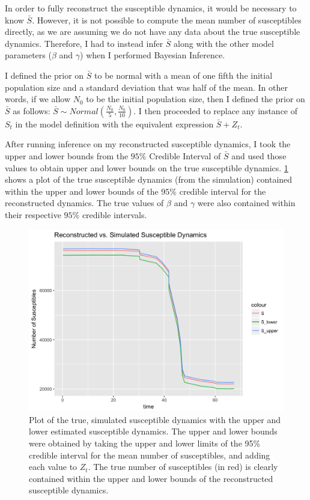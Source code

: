 \documentclass{article}
\begin{document}
In order to fully reconstruct the susceptible dynamics, it would be necessary to know $\bar{S}$. However, it is not possible to compute the mean number of susceptibles directly, as we are assuming we do not have any data about the true susceptible dynamics. Therefore, I had to instead infer $\bar{S}$ along with the other model parameters ($\beta$ and $\gamma$) when I performed Bayesian Inference. 

I defined the prior on $\bar{S}$ to be normal with a mean of one fifth the initial population size and a standard deviation that was half of the mean. In other words, if we allow $N_{0}$ to be the initial population size, then I defined the prior on $\bar{S}$ as follows: $\bar{S} \sim Normal(\frac{N_{0}}{5}, \frac{N_{0}}{10})$. I then proceeded to replace any instance of $S_{t}$ in the model definition with the equivalent expression $\bar{S} + Z_{t}$. 

After running inference on my reconstructed susceptible dynamics, I took the upper and lower bounds from the $95\%$ Credible Interval of $\bar{S}$ and used those values to obtain upper and lower bounds on the true susceptible dynamics. \ref{fig:SR} shows a plot of the true susceptible dynamics (from the simulation) contained within the upper and lower bounds of the $95\%$ credible interval for the reconstructed dynamics. The true values of $\beta$ and $\gamma$ were also contained within their respective $95\%$ credible intervals. 

\begin{figure}[htbp]
\includegraphics[scale=.25, center]{SRplot.png}
\caption{Plot of the true, simulated susceptible dynamics with the upper and lower estimated susceptible dynamics. The upper and lower bounds were obtained by taking the upper and lower limits of the 95\% credible interval for the mean number of susceptibles, and adding each value to $Z_{t}$. The true number of susceptibles (in red) is clearly contained within the upper and lower bounds of the reconstructed susceptible dynamics.}
\label{fig:SR}
\end{figure}
\end{document}
